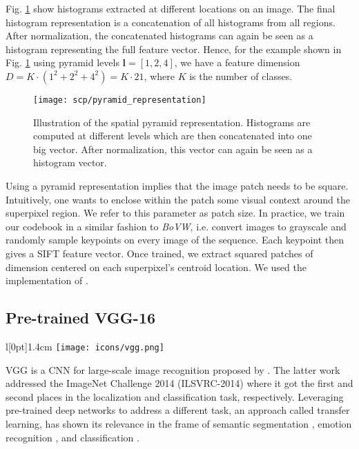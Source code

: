 Fig. \ref{fig:pyramid_repr} show histograms extracted at different locations on an image.
The final histogram representation is a concatenation of all histograms from all regions.
After normalization, the concatenated histograms can again be seen as a histogram representing the full feature vector.
Hence, for the example shown in Fig. \ref{fig:pyramid_repr} using pyramid levels $\boldsymbol{l} = [1,2,4]$, we have a feature dimension $D = K \cdot (1^2 + 2^2 + 4^2) = K \cdot 21$, where $K$ is the number of classes.

\begin{figure}[htbp]
  \centering
  \texttt{[image: scp/pyramid\_representation]}
  \caption[Spatial pyramid representation]{Illustration of the spatial pyramid representation. Histograms are computed at different levels which are then concatenated into one big vector. After normalization, this vector can again be seen as a histogram vector.}
  \label{fig:pyramid_repr}
\end{figure}

Using a pyramid representation implies that the image patch needs to be square. Intuitively, one wants to enclose within the patch some visual context around the superpixel region. We refer to this parameter as patch size.
In practice, we train our codebook in a similar fashion to \textit{BoVW}, i.e. convert images to grayscale and randomly sample keypoints on every image of the sequence. Each keypoint then gives a SIFT feature vector. Once trained, we extract squared patches of dimension centered on each superpixel's centroid location. We used the implementation of \cite{imdescrip}.

\subsection{Pre-trained VGG-16} \label{vgg}
\begingroup
\setlength\intextsep{0pt}
\begin{wrapfigure}[4]{l}[0pt]{1.4cm}
\texttt{[image: icons/vgg.png]}
\end{wrapfigure}

VGG is a CNN for large-scale image recognition proposed by \cite{simonyan15}.
The latter work addressed the ImageNet \cite{ILSVRC15} Challenge 2014 (ILSVRC-2014) where it got the first and second places in the localization and classification task, respectively.
Leveraging pre-trained deep networks to address a different task, an approach called transfer learning, has shown its relevance in the frame of semantic segmentation \cite{long15}, emotion recognition \cite{ng15}, and classification \cite{huynh16}.

